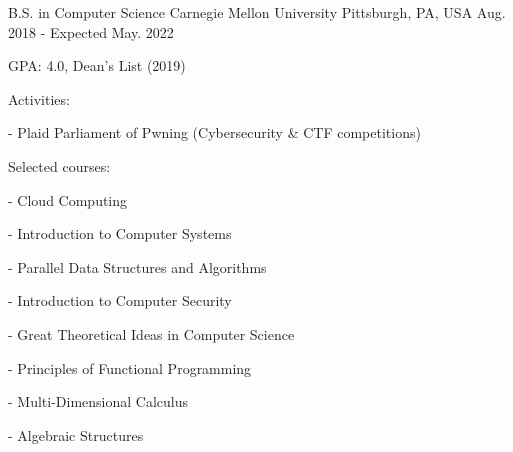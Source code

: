 

\begin{cventries}

  \cventry
    {B.S. in Computer Science} %
    {Carnegie Mellon University} %
    {Pittsburgh, PA, USA} %
    {Aug. 2018 - Expected May. 2022} %
    {
      \begin{cvitems} %
      \item {GPA: 4.0, Dean's List (2019)}
      \item {Activities:}
          \item[-] {Plaid Parliament of Pwning (Cybersecurity \& CTF competitions)}
      \item {Selected courses:}
        \setlength\multicolsep{0pt}
        \begin{multicols}{3}
          \item[-] {Cloud Computing}
          \item[-] {Introduction to Computer Systems}
          \item[-] {Parallel Data Structures and Algorithms}
          \item[-] {Introduction to Computer Security}
          \item[-] {Great Theoretical Ideas in Computer Science}
          \item[-] {Principles of Functional Programming}
          \item[-] {Multi-Dimensional Calculus}
          \item[-] {Algebraic Structures}
        \end{multicols}
      \end{cvitems}
    }
\end{cventries}
